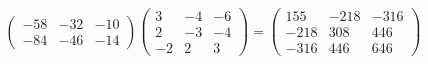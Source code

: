 \documentclass{article}
\begin{document}
\begin{center}
$$\begin{pmatrix}
            -58 & -32 & -10 \\
            -84 & -46 & -14
        \end{pmatrix}\begin{pmatrix}
            3  & -4 & -6 \\
            2  & -3 & -4 \\
            -2 & 2  & 3
        \end{pmatrix} = \begin{pmatrix}
            155  & -218 & -316 \\
            -218 & 308  & 446  \\
            -316 & 446  & 646
        \end{pmatrix}
    $$
\end{center}
\end{document}
